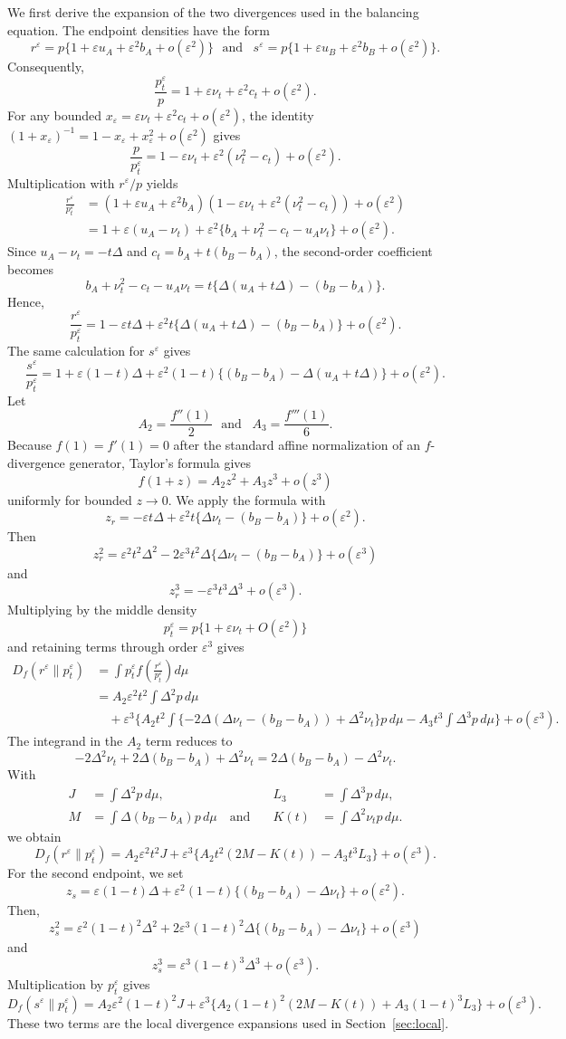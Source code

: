 \documentclass[11pt]{article}
\theoremstyle{plain}
\theoremstyle{definition}
\theoremstyle{definition}
\newcommand{\eps}{\varepsilon}
\begin{document}
We first derive the expansion of the two divergences used in the balancing equation. The endpoint densities have the form
\[
r^\eps=p\{1+\eps u_A+\eps^2b_A+o(\eps^2)\}
\,\,\,\,\text{and}\,\,\,\,\,
s^\eps=p\{1+\eps u_B+\eps^2b_B+o(\eps^2)\}.
\]
Consequently,
\[
\frac{p_t^\eps}{p}=1+\eps\nu_t+\eps^2c_t+o(\eps^2).
\]
For any bounded $x_\eps=\eps\nu_t+\eps^2c_t+o(\eps^2)$, the identity $(1+x_\eps)^{-1}=1-x_\eps+x_\eps^2+o(\eps^2)$ gives
\[
\frac{p}{p_t^\eps}=1-\eps\nu_t+
\eps^2(\nu_t^2-c_t)+o(\eps^2).
\]
Multiplication with $r^\eps/p$ yields
\[
\begin{aligned}
\frac{r^\eps}{p_t^\eps}
&=(1+\eps u_A+\eps^2b_A)
  (1-\eps\nu_t+\eps^2(\nu_t^2-c_t))+o(\eps^2)\\
&=1+\eps(u_A-\nu_t)+\eps^2\{b_A+\nu_t^2-c_t-u_A\nu_t\}+o(\eps^2).
\end{aligned}
\]
Since $u_A-\nu_t=-t\Delta$ and $c_t=b_A+t(b_B-b_A)$, the second-order coefficient becomes
\[
b_A+\nu_t^2-c_t-u_A\nu_t
=t\{\Delta(u_A+t\Delta)-(b_B-b_A)\}.
\]
Hence,
\[
\frac{r^\eps}{p_t^\eps}=1-\eps t\Delta+
\eps^2t\{\Delta(u_A+t\Delta)-(b_B-b_A)\}+o(\eps^2).
\]
The same calculation for $s^\eps$ gives
\[
\frac{s^\eps}{p_t^\eps}=1+\eps(1-t)\Delta+
\eps^2(1-t)\{(b_B-b_A)-\Delta(u_A+t\Delta)\}+o(\eps^2).
\]
Let
\[
A_2=\frac{f''(1)}2 \,\,\,\,\text{and}\,\,\,\,\,
A_3=\frac{f'''(1)}6.
\]
Because $f(1)=f'(1)=0$ after the standard affine normalization of an $f$-divergence generator, Taylor's formula gives
\[
f(1+z)=A_2z^2+A_3z^3+o(z^3)
\]
uniformly for bounded $z\to0$. We apply the formula with
\[
z_r=-\eps t\Delta+
\eps^2t\{\Delta\nu_t-(b_B-b_A)\}+o(\eps^2).
\]
Then
\[
z_r^2=\eps^2t^2\Delta^2-2\eps^3t^2\Delta\{\Delta\nu_t-(b_B-b_A)\}+o(\eps^3)
\]
and
\[
z_r^3=-\eps^3t^3\Delta^3+o(\eps^3).
\]
Multiplying by the middle density
\[
p_t^\eps=p\{1+\eps\nu_t+O(\eps^2)\}
\]
and retaining terms through order $\eps^3$ gives
\[
\begin{aligned}
D_f(r^\eps\|p_t^\eps)
&=\int p_t^\eps f\!\left(\frac{r^\eps}{p_t^\eps}\right)d\mu\\
&=A_2\eps^2t^2\int\Delta^2p\,d\mu\\
&\quad+\eps^3\Biggl\{
A_2t^2\int\{-2\Delta(\Delta\nu_t-(b_B-b_A))
+\Delta^2\nu_t\}p\,d\mu
-A_3t^3\int\Delta^3p\,d\mu\Biggr\}+o(\eps^3).
\end{aligned}
\]
The integrand in the $A_2$ term reduces to
\[
-2\Delta^2\nu_t+2\Delta(b_B-b_A)+\Delta^2\nu_t
=2\Delta(b_B-b_A)-\Delta^2\nu_t.
\]
With
\[
\begin{aligned}
J&=\int\Delta^2p\,d\mu,
&L_3&=\int\Delta^3p\,d\mu,\\
M&=\int\Delta(b_B-b_A)p\,d\mu \quad\text{and}\quad
&K(t)&=\int\Delta^2\nu_t p\,d\mu.
\end{aligned}
\]
we obtain
\[
D_f(r^\eps\|p_t^\eps)=A_2\eps^2t^2J+
\eps^3\{A_2t^2(2M-K(t))-A_3t^3L_3\}+o(\eps^3).
\]
For the second endpoint, we set
\[
z_s=\eps(1-t)\Delta+
\eps^2(1-t)\{(b_B-b_A)-\Delta\nu_t\}+o(\eps^2).
\]
Then,
\[
z_s^2=\eps^2(1-t)^2\Delta^2+2\eps^3(1-t)^2\Delta\{(b_B-b_A)-\Delta\nu_t\}+o(\eps^3)
\]
and
\[
z_s^3=\eps^3(1-t)^3\Delta^3+o(\eps^3).
\]
Multiplication by $p_t^\eps$ gives
\[
D_f(s^\eps\|p_t^\eps)=A_2\eps^2(1-t)^2J+
\eps^3\{A_2(1-t)^2(2M-K(t))+A_3(1-t)^3L_3\}+o(\eps^3).
\]
These two terms are the local divergence expansions used in Section~\ref{sec:local}.
\end{document}
